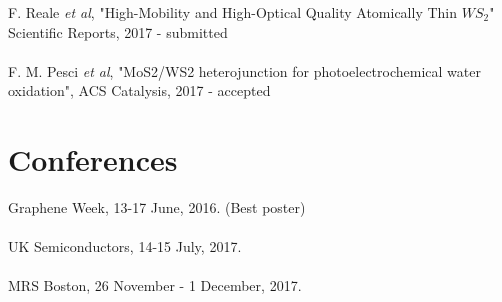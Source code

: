 \documentclass[12pt, a4paper]{article}
\begin{document}
F. Reale \textit{et al}, "High-Mobility and High-Optical Quality Atomically Thin $WS_2$" Scientific Reports, 2017 - submitted\\ \\
F. M. Pesci \textit{et al}, "MoS2/WS2 heterojunction for photoelectrochemical water oxidation", ACS Catalysis, 2017 - accepted

\section*{Conferences}

Graphene Week, 13-17 June, 2016. (Best poster)\\ \\
UK Semiconductors, 14-15 July, 2017.\\ \\
MRS Boston, 26 November - 1 December, 2017.


{}
\end{document}

